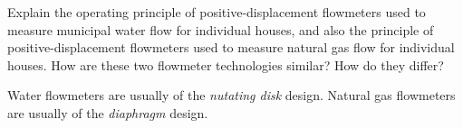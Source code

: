 

Explain the operating principle of positive-displacement flowmeters used to measure municipal water flow for individual houses, and also the principle of positive-displacement flowmeters used to measure natural gas flow for individual houses.  How are these two flowmeter technologies similar?  How do they differ?







Water flowmeters are usually of the {\it nutating disk} design.  Natural gas flowmeters are usually of the {\it diaphragm} design.











